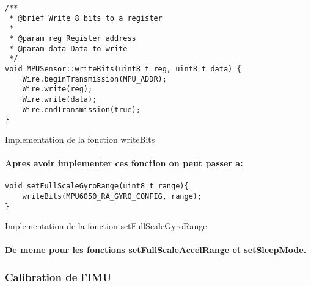 \begin{listing}[!htpb]
	\begin{verbatim}
/** 
 * @brief Write 8 bits to a register
 * 
 * @param reg Register address
 * @param data Data to write
 */
void MPUSensor::writeBits(uint8_t reg, uint8_t data) {
	Wire.beginTransmission(MPU_ADDR);
	Wire.write(reg);
	Wire.write(data);
	Wire.endTransmission(true);
}
	\end{verbatim}
	\caption{Implementation de la fonction writeBits}
	\label{listing:write-bits}
\end{listing}

\paragraph{Apres avoir implementer ces fonction on peut passer a:}
\paragraph*{}
\begin{listing}[!htpb]
	\begin{verbatim}
void setFullScaleGyroRange(uint8_t range){
	writeBits(MPU6050_RA_GYRO_CONFIG, range);
}
	\end{verbatim}
	\caption{Implementation de la fonction setFullScaleGyroRange}
	\label{listing:set-full-scale-gyro-range}
\end{listing}

\paragraph*{De meme pour les fonctions setFullScaleAccelRange et setSleepMode.}

\subsubsection*{Calibration de l'IMU}

